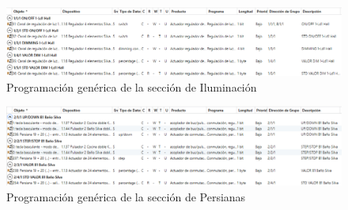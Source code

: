 \begin{landscape}

\begin{figure}[H]
\includegraphics[width=1.55\textwidth]{figures/prog_dim.png}   
\caption{Programación genérica de la sección de Iluminación}
\label{fig:prog_dim}
\end{figure}

\begin{figure}[H]
\includegraphics[width=1.55\textwidth]{figures/prog_pers.png}   
\caption{Programación genérica de la sección de Persianas}
\label{fig:prog_pers}
\end{figure}


\end{landscape}
